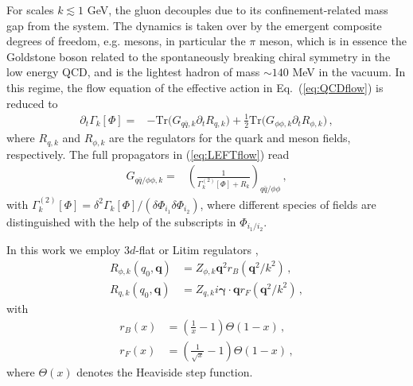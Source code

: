 \documentclass[%
reprint,
superscriptaddress,
showpacs,preprintnumbers,
amsmath,amssymb,
aps,
prd,
]{revtex4-1}
\def\Eq#1{Eq.~(\ref{#1})}
\def\eq#1{(\ref{#1})}
\begin{document}
	For scales $k\lesssim 1$ GeV, the gluon decouples due to its confinement-related mass gap from the system. The dynamics is taken over by the emergent composite degrees of freedom, e.g. mesons, in particular the $\pi$ meson, which is in essence the Goldstone boson related to the spontaneously breaking chiral symmetry in the low energy QCD, and is the lightest hadron of mass $\sim 140$ MeV in the vacuum. In this regime, the flow equation of the effective action in \Eq{eq:QCDflow} is reduced to 
	\begin{align}
		\partial_t\Gamma_k[\Phi]=&-\mathrm{Tr}\Big(G_{q\bar q,k}\partial_t R_{q,k}\Big)+\frac{1}{2}\mathrm{Tr}\Big(G_{\phi\phi,k}\partial_t R_{\phi,k}\Big)\,,\label{eq:LEFTflow}
	\end{align}
	where $R_{q,k}$ and $R_{\phi,k}$ are the regulators for the quark and meson fields, respectively. The full propagators in \eq{eq:LEFTflow} read
	\begin{align}
		G_{q\bar q/\phi\phi,k}=&\left(\frac{1}{\Gamma^{(2)}_k[\Phi]+R_k}\right)_{q\bar q/\phi\phi}\,,\label{}
	\end{align}
	with $\Gamma^{(2)}_k[\Phi]=\delta^2\Gamma_k[\Phi]/(\delta \Phi_{i_1}\delta \Phi_{i_2})$, where different species of fields are distinguished with the help of the subscripts in $\Phi_{i_1/i_2}$. 
	
	In this work we employ  $3d$-flat or Litim regulators \cite{Litim:2000ci, Litim:2001up, Litim:2006ag}, 
	\begin{align}\nonumber 
		R_{\phi,k}(q_0,\bm{q})&=Z_{\phi,k}\bm{q}^2 r_B(\bm{q}^2/k^2)\,, \\[2ex] 
		R_{q,k}(q_0,\bm{q})&=Z_{q,k}i\bm{\gamma} \cdot \bm{q} r_F(\bm{q}^2/k^2)\,, \label{eq:Rk}
	\end{align} 
	with 
	\begin{align}\nonumber 
		r_B(x)&=\left( \frac{1}{x}-1 \right)\Theta(1-x)\,,\\[2ex] 
		r_F(x)&=\left( \frac{1}{\sqrt{x}}-1 \right)\Theta(1-x)\,,  \label{eq:rk}
	\end{align} 
	where $\Theta(x)$ denotes the Heaviside step function. 
	
\end{document}
